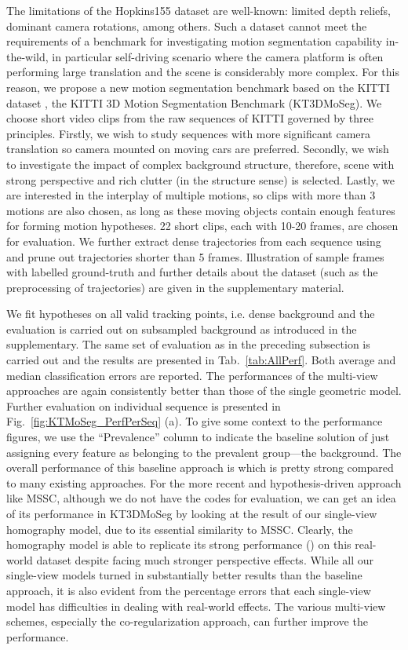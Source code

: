 \documentclass[10pt,twocolumn,letterpaper]{article}
\begin{document}
The limitations of the Hopkins155 dataset are well-known: limited depth reliefs, dominant camera rotations, among others. 
Such a dataset cannot meet the requirements of a benchmark for investigating motion segmentation capability in-the-wild, in particular self-driving scenario where the camera platform is often performing large translation and the scene is considerably more complex. For this reason, we propose a new motion segmentation benchmark based on the KITTI dataset \cite{Geiger2013IJRR}, the KITTI 3D Motion Segmentation Benchmark (KT3DMoSeg). We choose short video clips from the raw sequences of KITTI governed by three principles. Firstly, we wish to study sequences with more significant camera translation so camera mounted on moving cars are preferred. Secondly, we wish to investigate the impact of complex background structure, therefore, scene with strong perspective and rich clutter (in the structure sense) is selected. Lastly, we are interested in the interplay of multiple motions, so clips with more than 3 motions are also chosen, as long as these moving objects contain enough features for forming motion hypotheses. 22 short clips, each with 10-20 frames, are chosen for evaluation. We further extract dense trajectories from each sequence using \cite{Sundaram2010} and prune out trajectories shorter than 5 frames. Illustration of sample frames with labelled ground-truth and further details about the dataset (such as the preprocessing of trajectories) are given in the supplementary material.

We fit hypotheses on all valid tracking points, i.e. dense background and the evaluation is carried out on subsampled background as introduced in the supplementary. The same set of evaluation as in the preceding subsection is carried out and the results are presented in Tab.~\ref{tab:AllPerf}.  Both average and median classification errors are reported. The performances of the multi-view approaches are again consistently better than those of the single geometric model. Further evaluation on individual sequence is presented in Fig.~\ref{fig:KTMoSeg_PerfPerSeq} (a). To give some context to the performance figures, we use the ``Prevalence'' column to indicate the baseline solution of just assigning every feature as belonging to the prevalent group---the background. The overall performance of this baseline approach is  which is pretty strong compared to many existing approaches. For the more recent and hypothesis-driven approach like MSSC, although we do not have the codes for evaluation, we can get an idea of its performance in KT3DMoSeg by looking at the result of our single-view homography model, due to its essential similarity to MSSC. Clearly, the homography model is able to replicate its strong performance () on this real-world dataset despite facing much stronger perspective effects. While all our single-view models turned in substantially better results than the baseline approach, it is also evident from the percentage errors that each single-view model has difficulties in dealing with real-world effects. The various multi-view schemes, especially the co-regularization approach, can further improve the performance.
\end{document}
